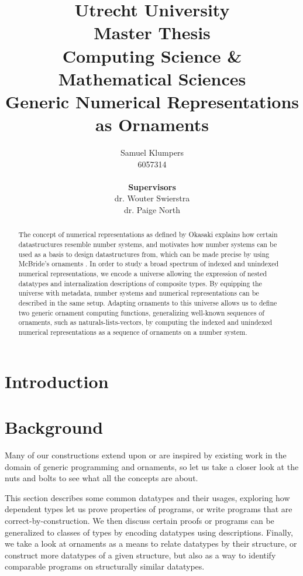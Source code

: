 \documentclass[10pt, final]{article}
\title{\large Utrecht University \\ Master Thesis \\ Computing Science \& Mathematical Sciences \\ \Large Generic Numerical Representations as Ornaments}
\author{Samuel Klumpers\\6057314\\ \\ \textbf{Supervisors} \\ dr. Wouter Swierstra \\ dr. Paige North}
\theoremstyle{plain}
\theoremstyle{definition}
\begin{document}
\maketitle

\newpage
\begin{abstract}
The concept of numerical representations as defined by Okasaki \cite{purelyfunctional} explains how certain datastructures resemble number systems, and motivates how number systems can be used as a basis to design datastructures from, which can be made precise by using McBride's ornaments \cite{algorn}. In order to study a broad spectrum of indexed and unindexed numerical representations, we encode a universe allowing the expression of nested datatypes and internalization descriptions of composite types. By equipping the universe with metadata, number systems and numerical representations can be described in the same setup. Adapting ornaments to this universe allows us to define two generic ornament computing functions, generalizing well-known sequences of ornaments, such as naturals-lists-vectors, by computing the indexed and unindexed numerical representations as a sequence of ornaments on a number system.
\end{abstract}


\newpage
\tableofcontents
\listoftodos
\newpage

\section{Introduction}\label{sec:introduction}



\section{Background}\label{part:background}
Many of our constructions extend upon or are inspired by existing work in the domain of generic programming and ornaments, so let us take a closer look at the nuts and bolts to see what all the concepts are about.

This section describes some common datatypes and their usages, exploring how dependent types let us prove properties of programs, or write programs that are correct-by-construction. We then discuss certain proofs or programs can be generalized to classes of types by encoding datatypes using descriptions. Finally, we take a look at ornaments as a means to relate datatypes by their structure, or construct more datatypes of a given structure, but also as a way to identify comparable programs on structurally similar datatypes.
\end{document}
